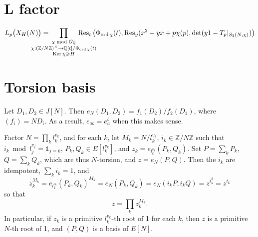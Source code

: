 \documentclass[12pt]{article}
\newcommand{\Z}{\mathbb{Z}}
\newcommand{\Q}{\mathbb{Q}}
\newcommand{\Ker}{\operatorname{Ker}}
\newcommand{\Res}{\operatorname{Res}}
\newcommand{\ord}{\operatorname{ord}}
\newcommand{\Frob}{\operatorname{Frob}}
\newcommand{\smat}[4]{\left[ \begin{smallmatrix} #1 & #2 \\ #3 & #4 \end{smallmatrix} \right]}
\theoremstyle{definition}
\begin{document}
%
%
%
% 
%

\section{L factor}

\[ L_p\big(X_H(N)\big) = \hspace{-1cm} \prod_{\substack{\chi \bmod G_\Q \\ \chi : (\Z/N\Z)^\times \rightarrow \Q[t]/\Phi_{\ord \chi}(t) \\ \Ker \chi \geqslant H}} \hspace{-1cm} \Res_t\big( \Phi_{\ord \chi}(t),\Res_y(x^2-yx+p\chi(p), \det(y1-T_p \vert_{S_2(N,\chi)}) \big) \]

\section{Torsion basis}

Let $D_1, D_2 \in J[N]$. Then $e_N(D_1,D_2) = f_1(D_2)/f_2(D_1)$, where $(f_i) = N D_i$. As a result, $e_{ab} = e_a^b$ when this makes sense.

Factor $N = \prod_k l_k^{v_k}$, and for each $k$, let $M_k = N/l_k^{v_k}$, $i_k \in \Z/N\Z$ such that $i_k \bmod l_j^{v_j} = \mathds{1}_{j=k}$, $P_k, Q_k \in E[l_k^{v_k}]$, and $z_k = e_{l_k^{v_k}}(P_k,Q_k)$. Set $P = \sum_k P_k$, $Q = \sum_k Q_k$, which are thus $N$-torsion, and $z=e_N(P,Q)$. Then the $i_k$ are idempotent, $\sum_k i_k = 1$, and
\[ z_k^{M_k} = e_{l_k^{v_k}}(P_k,Q_k)^{M_k} = e_N(P_k,Q_k) = e_N(i_k P, i_k Q) = z ^{i_k^2} = z^{i_k} \]
so that
\[ z = \prod_k z_k^{M_k}. \]
In particular, if $z_k$ is a primitive $l_k^{v_k}$-th root of 1 for each $k$, then $z$ is a primitive $N$-th root of 1, and $(P,Q)$ is a basis of $E[N]$.
\end{document}

